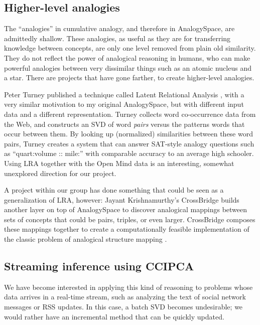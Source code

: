 \documentclass[11pt]{article}
\begin{document}
\subsection{Higher-level analogies}

The ``analogies'' in cumulative analogy, and therefore in AnalogySpace, are admittedly shallow. These analogies, as useful as they are for transferring knowledge between concepts, are only one level removed from plain old similarity. They do not reflect the power of analogical reasoning in humans, who can make powerful analogies between very dissimilar things such as an atomic nucleus and a star. There are projects that have gone farther, to create higher-level analogies.

Peter Turney published a technique called Latent Relational Analysis
\cite{turney}, with a very similar motivation to my original AnalogySpace, but
with different input data and a different representation. Turney collects word
co-occurrence data from the Web, and constructs an SVD of word {\em pairs}
versus the patterns words that occur between them.  By looking up (normalized)
similarities between these word pairs, Turney creates a system that can answer
SAT-style analogy questions such as ``quart:volume ::
mile:\underline{\hspace{1cm}}'' with comparable accuracy to an average high
schooler.  Using LRA together with the Open Mind data is an interesting,
somewhat unexplored direction for our project.

A project within our group has done something that could be seen as a
generalization of LRA, however: Jayant Krishnamurthy's CrossBridge
\cite{jayant} builds another layer on top of AnalogySpace to discover
analogical mappings between sets of concepts that could be pairs, triples, or
even larger. CrossBridge composes these mappings together to create a
computationally feasible implementation of the classic problem of analogical
structure mapping \cite{structure}.

\subsection{Streaming inference using CCIPCA}

We have become interested in applying this kind of reasoning to problems whose data arrives in a real-time stream, such as analyzing the text of social network messages or RSS updates. In this case, a batch SVD becomes undesirable; we would rather have an incremental method that can be quickly updated.
\end{document}
